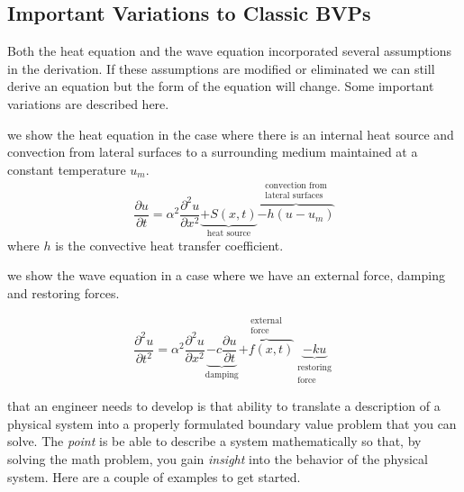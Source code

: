 \subsection{Important Variations to Classic BVPs}
Both the heat equation and the wave equation incorporated several assumptions in the derivation.  If these assumptions are modified or eliminated we can still derive an equation but the form of the equation will change.  Some important variations are described here.

 we show the heat equation in the case where there is an internal heat source and convection from lateral surfaces to a surrounding medium maintained at a constant temperature $u_m$.
\begin{equation}
\frac{\partial u}{\partial t} = \alpha^2 \frac{\partial^2 u}{\partial x^2} \underbrace{+ S(x,t)}_{\text{heat source}} \overbrace{- h(u-u_m)}^{\substack{\text{convection from} \\ \text{lateral surfaces}}}
\label{eq:heat-eq-with-variations}
\end{equation}
where $h$ is the convective heat transfer coefficient.

 we show the wave equation in a case where we have an external force, damping and restoring forces.

\begin{equation}
\frac{\partial^2 u}{\partial t^2} = \alpha^2 \frac{\partial^2 u}{\partial x^2} \underbrace{-c\frac{\partial u}{\partial t}}_{\text{damping}}\overbrace{+f(x,t)}^{\substack{\text{external}\\\text{force}}}\underbrace{-ku}_{\substack{\text{restoring}\\ \text{force}}}
\label{eq:wave-eq-with-variations}
\end{equation}

 that an engineer needs to develop is that ability to translate a description of a physical system into a properly formulated boundary value problem that you can solve.  The \emph{point} is be able to describe a system mathematically so that, by solving the math problem, you gain \emph{insight} into the behavior of the physical system.  Here are a couple of examples to get started.

\vspace{0.5cm}

